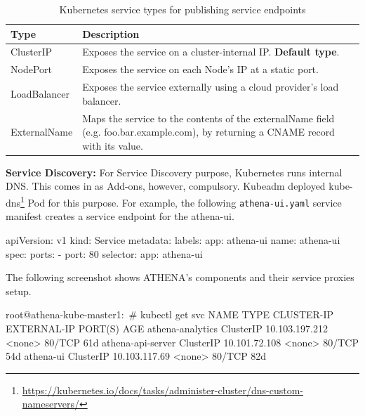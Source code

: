 \begin{table}[H]
\centering
    \begin{tabular}{ | l | p{11cm} |}
    \hline
    Type & Description \\ \hline
    ClusterIP & Exposes the service on a cluster-internal IP. \textbf{Default type}. \\ \hline
    NodePort & Exposes the service on each Node’s IP at a static port. \\  \hline
    LoadBalancer & Exposes the service externally using a cloud provider’s load balancer. \\ \hline
    ExternalName & Maps the service to the contents of the externalName field (e.g. foo.bar.example.com), by returning a CNAME record with its value. \\
    \hline
    \end{tabular}
\caption{Kubernetes service types for publishing service endpoints}
\label{kubeServiceTypes}  
\end{table}

\noindent \textbf{Service Discovery:} \quad For Service Discovery purpose, Kubernetes runs internal DNS. This comes in as Add-ons, however, compulsory. Kubeadm deployed kube-dns\footnote{\url{https://kubernetes.io/docs/tasks/administer-cluster/dns-custom-nameservers/}} Pod for this purpose. For example, the following \verb|athena-ui.yaml| service manifest creates a service endpoint for the athena-ui.

\begin{small}
\begin{lcverbatim}
apiVersion: v1
kind: Service
metadata:
  labels:
    app: athena-ui
  name: athena-ui
spec:
  ports:
    - port: 80
  selector:
    app: athena-ui
\end{lcverbatim}
\end{small}

\noindent The following screenshot shows ATHENA's components and their service proxies setup. 

\begin{small}
\begin{lcverbatim}
root@athena-kube-master1:~# kubectl get svc
NAME                TYPE        CLUSTER-IP       EXTERNAL-IP   PORT(S)   AGE
athena-analytics    ClusterIP   10.103.197.212   <none>        80/TCP    61d
athena-api-server   ClusterIP   10.101.72.108    <none>        80/TCP    54d
athena-ui           ClusterIP   10.103.117.69    <none>        80/TCP    82d
\end{lcverbatim}
\end{small}

